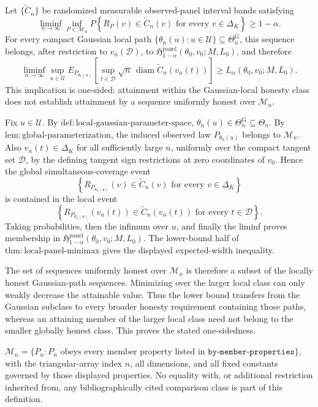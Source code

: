 Let \(\{\widetilde C_n\}\) be randomized measurable observed-panel interval bands satisfying
\[
\liminf_{n\to\infty}\inf_{P\in\mathcal M_n}
P\!\left\{
R_P(v)\in\widetilde C_n(v)
\text{ for every }v\in\Delta_K
\right\}
\ge1-\alpha.
\]
For every compact Gaussian local path
\(\{\theta_n(u):u\in\mathcal U\}\subseteq\Theta_n^{\mathrm G}\), this sequence belongs, after restriction to \(v_n(\mathcal D)\), to
\(\mathfrak H^{\mathrm{panel}}_{1-\alpha}(\theta_0,v_0;M,L_0)\), and therefore
\[
\liminf_{n\to\infty}\sup_{u\in\mathcal U}
E_{P_{\theta_n(u)}}\!\left[
\sup_{t\in\mathcal D}\sqrt n\,
\operatorname{diam}\widetilde C_n(v_n(t))
\right]
\ge L_\alpha(\theta_0,v_0;M,L_0).
\]
This implication is one-sided: attainment within the Gaussian-local honesty class does not establish attainment by a sequence uniformly honest over \(\mathcal M_n\).

Fix \(u\in\mathcal U\).  By
\(\mathrm{def:local\mbox{-}gaussian\mbox{-}parameter\mbox{-}space}\),
\(\theta_n(u)\in\Theta_n^{\mathrm G}\subseteq\Theta_n\).  By
\(\mathrm{lem:global\mbox{-}parameterization}\), the induced observed law
\(P_{\theta_n(u)}\) belongs to \(\mathcal M_n\).  Also
\(v_n(t)\in\Delta_K\) for all sufficiently large \(n\), uniformly over the compact tangent set \(\mathcal D\), by the defining tangent sign restrictions at zero coordinates of \(v_0\).  Hence the global simultaneous-coverage event
\[
\left\{
R_{P_{\theta_n(u)}}(v)
\in\widetilde C_n(v)
\text{ for every }v\in\Delta_K
\right\}
\]
is contained in the local event
\[
\left\{
R_{P_{\theta_n(u)}}(v_n(t))
\in\widetilde C_n(v_n(t))
\text{ for every }t\in\mathcal D
\right\}.
\]
Taking probabilities, then the infimum over \(u\), and finally the liminf proves membership in
\(\mathfrak H^{\mathrm{panel}}_{1-\alpha}(\theta_0,v_0;M,L_0)\).  The lower-bound half of
\(\mathrm{thm:local\mbox{-}panel\mbox{-}minimax}\) gives the displayed expected-width inequality.

The set of sequences uniformly honest over \(\mathcal M_n\) is therefore a subset of the locally honest Gaussian-path sequences.  Minimizing over the larger local class can only weakly decrease the attainable value.  Thus the lower bound transfers from the Gaussian subclass to every broader honesty requirement containing those paths, whereas an attaining member of the larger local class need not belong to the smaller globally honest class.  This proves the stated one-sidedness.

\(\mathcal M_n=\{P_n:P_n\text{ obeys every member property listed in }\texttt{by-member-properties}\}\), with the triangular-array index \(n\), all dimensions, and all fixed constants governed by those displayed properties.  No equality with, or additional restriction inherited from, any bibliographically cited comparison class is part of this definition.

